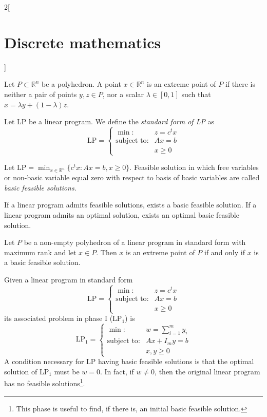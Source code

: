 \documentclass[class=article,10pt,crop=false]{standalone}
\begin{document}
\begin{multicols}{2}[\section{Discrete mathematics}]
\begin{definition}
\end{definition}
\begin{definition}
Let $P\subset\mathbb{R}^n$ be a polyhedron. A point $x\in\mathbb{R}^n$ is an extreme point of $P$ if there is neither a pair of points $y,z\in P$, nor a scalar $\lambda\in[0,1]$ such that $x=\lambda y+(1-\lambda)z$.
\end{definition}
\begin{definition}
Let LP be a linear program. We define the \textit{standard form of LP} as $$\text{LP}=\left\{\begin{array}{rc}
    \min: & z=c^tx \\
    \text{subject to}: & Ax=b\\
     & x\geq 0
    \end{array}\right.$$
\end{definition}
\begin{definition}
Let $\displaystyle \text{LP}=\min_{x\in\mathbb{R}^n}\{c^tx:Ax=b,x\geq 0\}$. Feasible solution in which free variables or non-basic variable equal zero with respect to basis of basic variables are called \textit{basic feasible solutions}.
\end{definition}
\begin{prop}
If a linear program admits feasible solutions, exists a basic feasible solution. If a linear program admits an optimal solution, exists an optimal basic feasible solution.
\end{prop}
\begin{theorem}
Let $P$ be a non-empty polyhedron of a linear program in standard form with maximum rank and let $x\in P$. Then $x$ is an extreme point of $P$ if and only if $x$ is a basic feasible solution.
\end{theorem}
\begin{definition}
Given a linear program in standard form $$\text{LP}=\left\{\begin{array}{rc}
    \min: & z=c^tx \\
    \text{subject to}: & Ax=b\\
     & x\geq 0
    \end{array}\right.$$ its associated problem in phase I ($\text{LP}_1$) is $$\text{LP}_1=\left\{\begin{array}{rc}
    \min: & \displaystyle w=\sum_{i=1}^my_i \\
    \text{subject to}: & Ax+I_my=b\\
     & x,y\geq 0
    \end{array}\right.$$
    A condition necessary for LP having basic feasible solutions is that the optimal solution of $\text{LP}_1$ must be $w=0$. In fact, if $w\ne 0$, then the original linear program has no feasible solutions\footnote{This phase is useful to find, if there is, an initial basic feasible solution.}.

\end{definition}
\end{multicols}
\end{document}

